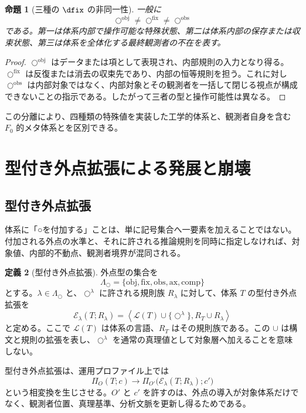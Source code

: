 \documentclass[a4paper,11pt]{ltjsarticle}
\theoremstyle{definition}
\newtheorem{definition}{定義}[section]
\theoremstyle{plain}
\newtheorem{proposition}[definition]{命題}
\newcommand{\Phase}{\Pi}
\newcommand{\ofix}{\bigcirc^{\mathrm{fix}}}
\newcommand{\oobs}{\bigcirc^{\mathrm{obs}}}
\newcommand{\oobj}{\bigcirc^{\mathrm{obj}}}
\newcommand{\CircleExt}{\mathcal{E}}
\begin{document}
\begin{proposition}[三種の $\dfix$ の非同一性]
一般に
\[
 \oobj\neq\ofix\neq\oobs
\]
である。第一は体系内部で操作可能な特殊状態、第二は体系内部の保存または収束状態、第三は体系を全体化する最終観測者の不在を表す。
\end{proposition}

\begin{proof}
$\oobj$ はデータまたは項として表現され、内部規則の入力となり得る。$\ofix$ は反復または消去の収束先であり、内部の恒等規則を担う。これに対し $\oobs$ は内部対象ではなく、内部対象とその観測者を一括して閉じる視点が構成できないことの指示である。したがって三者の型と操作可能性は異なる。
\end{proof}

この分離により、四種類の特殊値を実装した工学的体系と、観測者自身を含む $F_0$ 的メタ体系とを区別できる。

\section{型付き外点拡張による発展と崩壊}

\subsection{型付き外点拡張}

体系に「○を付加する」ことは、単に記号集合へ一要素を加えることではない。付加される外点の水準と、それに許される推論規則を同時に指定しなければ、対象値、内部的不動点、観測者境界が混同される。

\begin{definition}[型付き外点拡張]
外点型の集合を
\[
 \Lambda_{\bigcirc}
 =
 \{\mathrm{obj},\mathrm{fix},\mathrm{obs},
   \mathrm{ax},\mathrm{comp}\}
\]
とする。$\lambda\in\Lambda_{\bigcirc}$ と、$\bigcirc^\lambda$ に許される規則族 $R_\lambda$ に対して、体系 $T$ の型付き外点拡張を
\[
 \CircleExt_\lambda(T;R_\lambda)
 =
 \left\langle
 \mathcal L(T)\cup\{\bigcirc^\lambda\},
 R_T\cup R_\lambda
 \right\rangle
\]
と定める。ここで $\mathcal L(T)$ は体系の言語、$R_T$ はその規則族である。この $\cup$ は構文と規則の拡張を表し、$\bigcirc^\lambda$ を通常の真理値として対象層へ加えることを意味しない。
\end{definition}

型付き外点拡張は、運用プロファイル上では
\[
 \Phase_O(T;c)
 \longrightarrow
 \Phase_{O'}\bigl(\CircleExt_\lambda(T;R_\lambda);c'\bigr)
\]
という相変換を生じさせる。$O'$ と $c'$ を許すのは、外点の導入が対象体系だけでなく、観測者位置、真理基準、分析文脈を更新し得るためである。
\end{document}
